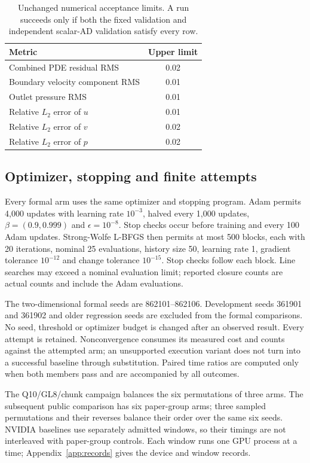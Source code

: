 \documentclass[11pt]{article}
\begin{document}
\begin{table}[t]
\centering
\caption{Unchanged numerical acceptance limits. A run succeeds only if both
the fixed validation and independent scalar-AD validation satisfy every row.}
\label{tab:thresholds}
\begin{tabular}{lc}\toprule
Metric & Upper limit\\\midrule
Combined PDE residual RMS & 0.02\\
Boundary velocity component RMS & 0.01\\
Outlet pressure RMS & 0.01\\
Relative $L_2$ error of $u$ & 0.01\\
Relative $L_2$ error of $v$ & 0.02\\
Relative $L_2$ error of $p$ & 0.02\\\bottomrule
\end{tabular}
\end{table}

\subsection{Optimizer, stopping and finite attempts}
Every formal arm uses the same optimizer and stopping program. Adam permits
4,000 updates with learning rate $10^{-3}$, halved every 1,000 updates,
$\beta=(0.9,0.999)$ and $\epsilon=10^{-8}$. Stop checks occur before training
and every 100 Adam updates. Strong-Wolfe L-BFGS then permits at most 500
blocks, each with 20 iterations, nominal 25 evaluations, history size 50,
learning rate 1, gradient tolerance $10^{-12}$ and change tolerance
$10^{-15}$. Stop checks follow each block. Line searches may exceed a
nominal evaluation limit; reported closure counts are actual counts and
include the Adam evaluations.

The two-dimensional formal seeds are 862101--862106. Development seeds
361901 and 361902 and older regression seeds are excluded from the formal
comparisons. No seed, threshold or optimizer budget is changed after an
observed result. Every attempt is retained. Nonconvergence consumes its
measured cost and counts against the attempted arm; an unsupported
execution variant does not turn into a successful baseline through
substitution. Paired time ratios are computed only when both members pass
and are accompanied by all outcomes.

The Q10/GL8/chunk campaign balances the six permutations of three arms.
The subsequent public comparison has six paper-group arms; three sampled
permutations and their reverses balance their order over the same six seeds.
NVIDIA baselines use separately admitted windows, so their timings are not
interleaved with paper-group controls. Each window runs one GPU process at
a time; Appendix~\ref{app:records} gives the device and window records.
\end{document}
